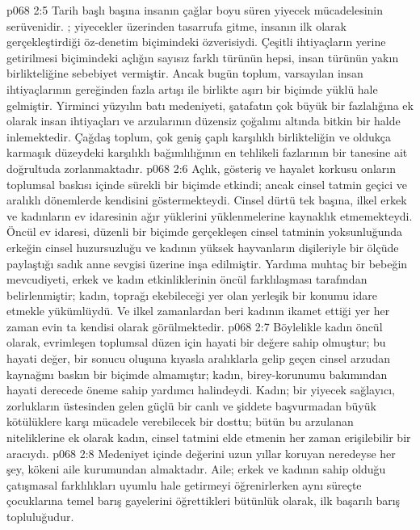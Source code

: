 \vs p068 2:5 Tarih başlı başına insanın çağlar boyu süren yiyecek mücadelesinin serüvenidir. ; yiyecekler üzerinden tasarrufa gitme, insanın ilk olarak gerçekleştirdiği öz\hyp{}denetim biçimindeki özverisiydi. Çeşitli ihtiyaçların yerine getirilmesi biçimindeki açlığın sayısız farklı türünün hepsi, insan türünün yakın birlikteliğine sebebiyet vermiştir. Ancak bugün toplum, varsayılan insan ihtiyaçlarının gereğinden fazla artışı ile birlikte aşırı bir biçimde yüklü hale gelmiştir. Yirminci yüzyılın batı medeniyeti, şatafatın çok büyük bir fazlalığına ek olarak insan ihtiyaçları ve arzularının düzensiz çoğalımı altında bitkin bir halde inlemektedir. Çağdaş toplum, çok geniş çaplı karşılıklı birlikteliğin ve oldukça karmaşık düzeydeki karşılıklı bağımlılığının en tehlikeli fazlarının bir tanesine ait doğrultuda zorlanmaktadır.
\vs p068 2:6 Açlık, gösteriş ve hayalet korkusu onların toplumsal baskısı içinde sürekli bir biçimde etkindi; ancak cinsel tatmin geçici ve aralıklı dönemlerde kendisini göstermekteydi. Cinsel dürtü tek başına, ilkel erkek ve kadınların ev idaresinin ağır yüklerini yüklenmelerine kaynaklık etmemekteydi. Öncül ev idaresi, düzenli bir biçimde gerçekleşen cinsel tatminin yoksunluğunda erkeğin cinsel huzursuzluğu ve kadının yüksek hayvanların dişileriyle bir ölçüde paylaştığı sadık anne sevgisi üzerine inşa edilmiştir. Yardıma muhtaç bir bebeğin mevcudiyeti, erkek ve kadın etkinliklerinin öncül farklılaşması tarafından belirlenmiştir; kadın, toprağı ekebileceği yer olan yerleşik bir konumu idare etmekle yükümlüydü. Ve ilkel zamanlardan beri kadının ikamet ettiği yer her zaman evin ta kendisi olarak görülmektedir.
\vs p068 2:7 Böylelikle kadın öncül olarak, evrimleşen toplumsal düzen için hayati bir değere sahip olmuştur; bu hayati değer,  bir sonucu oluşuna kıyasla aralıklarla gelip geçen cinsel arzudan kaynağını baskın bir biçimde almamıştır; kadın, birey\hyp{}korunumu bakımından hayati derecede öneme sahip yardımcı halindeydi. Kadın; bir yiyecek sağlayıcı, zorlukların üstesinden gelen güçlü bir canlı ve şiddete başvurmadan büyük kötülüklere karşı mücadele verebilecek bir dosttu; bütün bu arzulanan niteliklerine ek olarak kadın, cinsel tatmini elde etmenin her zaman erişilebilir bir aracıydı.
\vs p068 2:8 Medeniyet içinde değerini uzun yıllar koruyan neredeyse her şey, kökeni aile kurumundan almaktadır. Aile; erkek ve kadının sahip olduğu çatışmasal farklılıkları uyumlu hale getirmeyi öğrenirlerken aynı süreçte çocuklarına temel barış gayelerini öğrettikleri bütünlük olarak, ilk başarılı barış topluluğudur.
